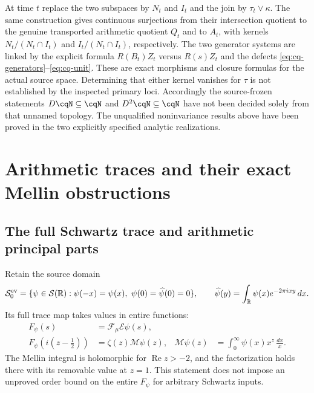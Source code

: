 At time $t$ replace the two subspaces by $N_t$ and $I_t$ and the
join by $\tau_t\vee\kappa$. The same construction gives continuous
surjections from their intersection quotient to the genuine transported
arithmetic quotient $Q_t$ and to $A_t$, with kernels
$N_t/(N_t\cap I_t)$ and $I_t/(N_t\cap I_t)$, respectively.
The two generator systems are linked by the explicit formula
$R(B_t)Z_t$ versus $R(s)Z_t$ and the defects
\eqref{eq:cq-generators}--\eqref{eq:cq-unit}.
These are exact morphisms and closure formulas for the actual source
space. Determining that either kernel vanishes for $\tau$ is not
established by the inspected primary loci. Accordingly the
source-frozen statements $D\cqN\subseteq\cqN$ and
$D^2\cqN\subseteq\cqN$ have not been decided solely from that
unnamed topology. The unqualified noninvariance results above have
been proved in the two explicitly specified analytic realizations.

\section{Arithmetic traces and their exact Mellin obstructions}
\label{sec:cq-arithmetic}
\subsection{The full Schwartz trace and arithmetic principal parts}
\label{sec:cq-principalparts}
Retain the source domain
\[
 \mathcal S_0^{\rm ev}
 =\{\psi\in\mathcal S(\mathbb R):
       \psi(-x)=\psi(x),\ \psi(0)=\widehat\psi(0)=0\},
 \qquad
 \widehat\psi(y)=\int_{\mathbb R}\psi(x)e^{-2\pi ixy}\,dx.
\]
Its full trace map takes values in entire functions:
\begin{equation}\label{eq:cq-Schwartz-trace}
 \begin{aligned}
 F_\psi(s)&=\mathcal F_\mu\mathcal E\psi(s),\\
 F_\psi(i(z-\tfrac12))&=\zeta(z)\mathcal M\psi(z),
 &\mathcal M\psi(z)&=\int_0^\infty\psi(x)x^z\,\frac{dx}{x}.
 \end{aligned}
\end{equation}
The Mellin integral is holomorphic for $\operatorname{Re}z>-2$,
and the factorization holds there with its removable value at
$z=1$. This statement does not impose an unproved order bound
on the entire $F_\psi$ for arbitrary Schwartz inputs.

